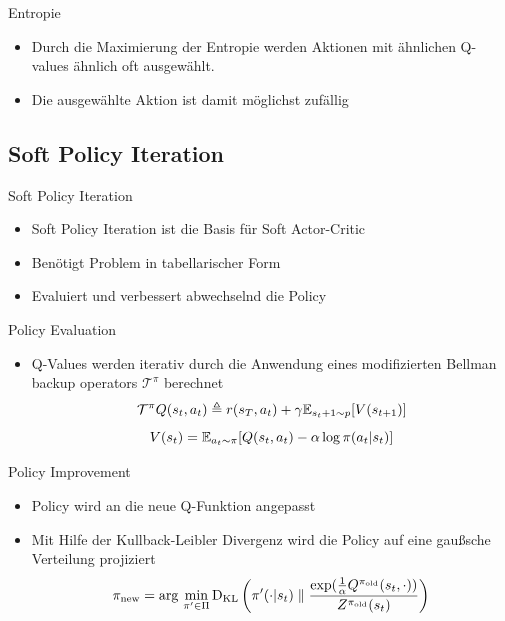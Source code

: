 \begin{frame}{Entropie}
	\begin{itemize}
		
		\item Durch die Maximierung der Entropie werden Aktionen mit ähnlichen Q-values ähnlich oft ausgewählt.
		\item Die ausgewählte Aktion ist damit möglichst zufällig
	\end{itemize} 
\end{frame}

\subsection{Soft Policy Iteration}
\begin{frame}{Soft Policy Iteration}
	\begin{itemize}
		\item Soft Policy Iteration ist die Basis für Soft Actor-Critic
		\item Benötigt Problem in tabellarischer Form
		\item Evaluiert und verbessert abwechselnd die Policy
	\end{itemize} 
\end{frame}

\begin{frame}{Policy Evaluation}
	\begin{itemize}
		\item Q-Values werden iterativ durch die Anwendung eines modifizierten Bellman backup operators $\mathcal{T}^\pi$ berechnet
		\begin{equation}
			\mathcal{T}^\pi \mathnormal{Q}(s_t,a_t) \triangleq \mathnormal{r}(s_T, a_t) + \gamma \mathbb{E}_{s_t+1\sim \mathnormal{p}}[\mathnormal{V}(s_{t+1})] \notag
		\end{equation}
		\begin{equation}
			\mathnormal{V}(s_{t}) = \mathbb{E}_{a_t \sim \pi}[\mathnormal{Q}(s_t, a_t) - \alpha \, \mathrm{log} \, \pi (a_t|s_t)] \notag
		\end{equation}
	\end{itemize}
\end{frame}

\begin{frame}{Policy Improvement}
	\begin{itemize}
		\item Policy wird an die neue Q-Funktion angepasst
		\item Mit Hilfe der Kullback-Leibler Divergenz wird die Policy auf eine gaußsche Verteilung projiziert
		\begin{equation}
			\pi_{\mathrm{new}} = \mathrm{arg} \, \min_{\pi^\prime \in \Pi} \mathrm{D_{KL}} \left( \pi^\prime(\cdot | s_t) \parallel \frac{\mathrm{exp} (\frac{1}{\alpha}\mathnormal{Q}^{\pi_{\mathrm{old}}}(s_t, \cdot))}{\mathnormal{Z}^{\pi_{\mathrm{old}}}(s_t)} \right) \notag
		\end{equation}
	\end{itemize} 
\end{frame}
